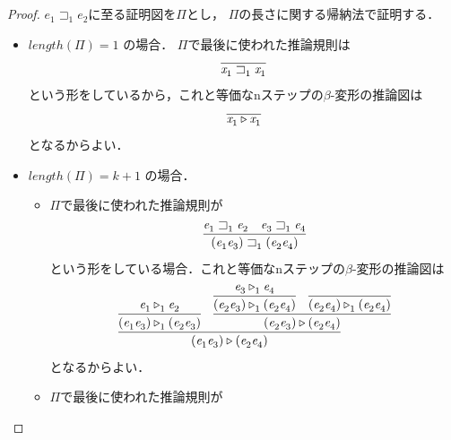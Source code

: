 \documentclass{ltjsbook}%
\begin{document}
\begin{proof}%
  $\mathit{e}_1^{}\sqsupset_1^{}\mathit{e}_2^{}$に至る証明図を$\Pi$とし，%
  $\Pi$の長さに関する帰納法で証明する．%
  \begin{itemize}%
  \item $length(\Pi)=1$ の場合．%
    $\Pi$で最後に使われた推論規則は%
    \begin{equation}%
      \infer{%
        \mathit{x}_1^{}\sqsupset_1^{}\mathit{x}_1^{}%
      }{%
      }%
    \end{equation}%
    という形をしているから，これと等価なnステップの$\beta$-変形の推論図は%
    \begin{equation}%
      \infer{%
        \mathit{x}_1^{}\triangleright\mathit{x}_1^{}%
      }{%
      }%
    \end{equation}%
    となるからよい．%
  \item $length(\Pi)=k + 1$ の場合．%
    \begin{itemize}%
    \item$\Pi$で最後に使われた推論規則が%
    \begin{equation}%
      \infer{%
        (\mathit{e}_1^{}\mathit{e}_3^{})\sqsupset_1^{}(\mathit{e}_2^{}\mathit{e}_4^{})%
      }{%
        \mathit{e}_1^{}\sqsupset_1^{}\mathit{e}_2^{}%
      &%
        \mathit{e}_3^{}\sqsupset_1^{}\mathit{e}_4^{}%
      }%
    \end{equation}%
    という形をしている場合．これと等価なnステップの$\beta$-変形の推論図は%
    \begin{equation}%
      \infer{%
        (\mathit{e}_1^{}\mathit{e}_3^{})\triangleright(\mathit{e}_2^{}\mathit{e}_4^{})%
      }{%
        \infer{%
          (\mathit{e}_1^{}\mathit{e}_3^{})\triangleright_1^{}(\mathit{e}_2^{}\mathit{e}_3^{})%
        }{%
          \mathit{e}_1^{}\triangleright_1^{}\mathit{e}_2^{}%
        }%
      &%
        \infer{%
          (\mathit{e}_2^{}\mathit{e}_3^{})\triangleright(\mathit{e}_2^{}\mathit{e}_4^{})%
        }{%
          \infer{%
            (\mathit{e}_2^{}\mathit{e}_3^{})\triangleright_1^{}(\mathit{e}_2^{}\mathit{e}_4^{})%
          }{%
            \mathit{e}_3^{}\triangleright_1^{}\mathit{e}_4^{}%
          }%
        &%
          \infer{%
            (\mathit{e}_2^{}\mathit{e}_4^{})\triangleright_1^{}(\mathit{e}_2^{}\mathit{e}_4^{})%
          }{}%
        }%
      }%
    \end{equation}%
    となるからよい．%
    \item$\Pi$で最後に使われた推論規則が%
    \begin{equation}%

\end{equation}
\end{itemize}
\end{itemize}
\end{proof}
\end{document}
